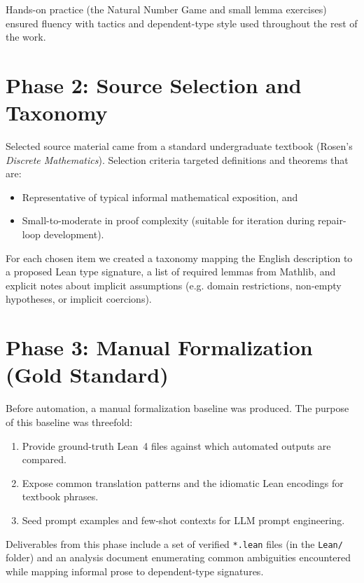 Hands-on practice (the Natural Number Game and small lemma exercises) ensured fluency with tactics and dependent-type style used throughout the rest of the work.

\section{Phase 2: Source Selection and Taxonomy}
\label{sec:phase2-selection}

Selected source material came from a standard undergraduate textbook (Rosen's \textit{Discrete Mathematics}). Selection criteria targeted definitions and theorems that are:

\begin{itemize}
    \item Representative of typical informal mathematical exposition, and
    \item Small-to-moderate in proof complexity (suitable for iteration during repair-loop development).
\end{itemize}

For each chosen item we created a taxonomy mapping the English description to a proposed Lean type signature, a list of required lemmas from Mathlib, and explicit notes about implicit assumptions (e.g. domain restrictions, non-empty hypotheses, or implicit coercions).

\section{Phase 3: Manual Formalization (Gold Standard)}
\label{sec:phase3-manual}

Before automation, a manual formalization baseline was produced. The purpose of this baseline was threefold:

\begin{enumerate}
    \item Provide ground-truth Lean~4 files against which automated outputs are compared.
    \item Expose common translation patterns and the idiomatic Lean encodings for textbook phrases.
    \item Seed prompt examples and few-shot contexts for LLM prompt engineering.
\end{enumerate}

Deliverables from this phase include a set of verified \texttt{*.lean} files (in the \texttt{Lean/} folder) and an analysis document enumerating common ambiguities encountered while mapping informal prose to dependent-type signatures.

